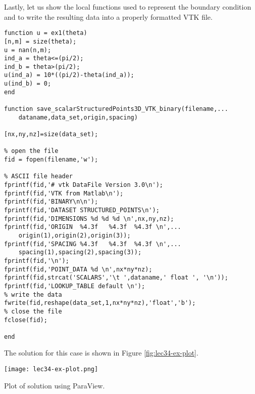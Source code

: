 Lastly, let us show the local functions used to represent the boundary condition and to write the resulting data into a properly formatted VTK file.
\begin{lstlisting}[name=lec34-ex, style=myMatlab]
%% Local functions
function u = ex1(theta)
[n,m] = size(theta);
u = nan(n,m);
ind_a = theta<=(pi/2);
ind_b = theta>(pi/2);
u(ind_a) = 10*((pi/2)-theta(ind_a));
u(ind_b) = 0;
end

function save_scalarStructuredPoints3D_VTK_binary(filename,...
    dataname,data_set,origin,spacing)

[nx,ny,nz]=size(data_set);

% open the file
fid = fopen(filename,'w');

% ASCII file header
fprintf(fid,'# vtk DataFile Version 3.0\n');
fprintf(fid,'VTK from Matlab\n');
fprintf(fid,'BINARY\n\n');
fprintf(fid,'DATASET STRUCTURED_POINTS\n');
fprintf(fid,'DIMENSIONS %d %d %d \n',nx,ny,nz);
fprintf(fid,'ORIGIN  %4.3f   %4.3f  %4.3f \n',...
    origin(1),origin(2),origin(3));
fprintf(fid,'SPACING %4.3f   %4.3f  %4.3f \n',...
    spacing(1),spacing(2),spacing(3));
fprintf(fid,'\n');
fprintf(fid,'POINT_DATA %d \n',nx*ny*nz);
fprintf(fid,strcat('SCALARS','\t ',dataname,' float ', '\n'));
fprintf(fid,'LOOKUP_TABLE default \n');
% write the data
fwrite(fid,reshape(data_set,1,nx*ny*nz),'float','b');
% close the file
fclose(fid);

end

\end{lstlisting}
The solution for this case is shown in Figure \ref{fig:lec34-ex-plot}.
\begin{marginfigure}
\texttt{[image: lec34-ex-plot.png]}
\caption{Plot of solution using ParaView.}
\label{fig:lec34-ex-plot}
\end{marginfigure}

